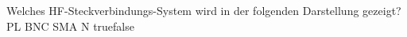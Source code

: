     {Welches HF-Steckverbindungs-System wird in der folgenden Darstellung gezeigt?}
    {PL}
    {BNC}
    {SMA}
    {N}
    {true}{false}